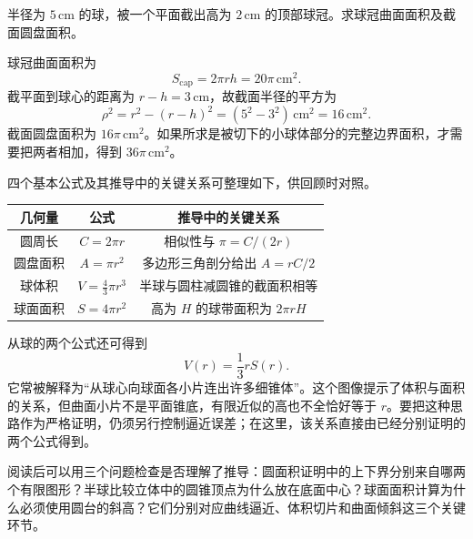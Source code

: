 \documentclass[UTF8]{ctexart}
\begin{document}
\begin{example}[球冠的曲面面积与截面圆盘面积]
半径为 $5\,\mathrm{cm}$ 的球，被一个平面截出高为 $2\,\mathrm{cm}$ 的顶部球冠。求球冠曲面面积及截面圆盘面积。
\end{example}
\begin{solve}
球冠曲面面积为
\[
  S_{\mathrm{cap}}=2\pi rh=20\pi\,\mathrm{cm}^2.
\]
截平面到球心的距离为 $r-h=3\,\mathrm{cm}$，故截面半径的平方为
\[
  \rho^2=r^2-(r-h)^2=(5^2-3^2)\,\mathrm{cm}^2=16\,\mathrm{cm}^2.
\]
截面圆盘面积为 $16\pi\,\mathrm{cm}^2$。如果所求是被切下的小球体部分的完整边界面积，才需要把两者相加，得到 $36\pi\,\mathrm{cm}^2$。
\end{solve}

四个基本公式及其推导中的关键关系可整理如下，供回顾时对照。
\begin{center}
\begin{tabular}{c c c}
\toprule
几何量 & 公式 & 推导中的关键关系 \\
\midrule
圆周长 & $C=2\pi r$ & 相似性与 $\pi=C/(2r)$ \\
圆盘面积 & $A=\pi r^2$ & 多边形三角剖分给出 $A=rC/2$ \\
球体积 & $V=\frac43\pi r^3$ & 半球与圆柱减圆锥的截面积相等 \\
球面面积 & $S=4\pi r^2$ & 高为 $H$ 的球带面积为 $2\pi rH$ \\
\bottomrule
\end{tabular}
\end{center}

从球的两个公式还可得到
\[
  V(r)=\frac13rS(r).
\]
它常被解释为“从球心向球面各小片连出许多细锥体”。这个图像提示了体积与面积的关系，但曲面小片不是平面锥底，有限近似的高也不全恰好等于 $r$。要把这种思路作为严格证明，仍须另行控制逼近误差；在这里，该关系直接由已经分别证明的两个公式得到。

阅读后可以用三个问题检查是否理解了推导：圆面积证明中的上下界分别来自哪两个有限图形？半球比较立体中的圆锥顶点为什么放在底面中心？球面面积计算为什么必须使用圆台的斜高？它们分别对应曲线逼近、体积切片和曲面倾斜这三个关键环节。
\end{document}
